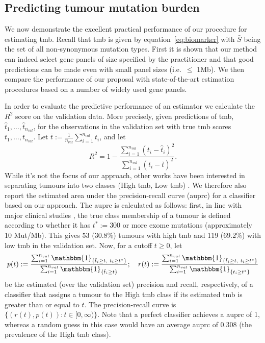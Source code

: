 \documentclass[10pt,twoside,openright]{report}
\begin{document}
\subsection{Predicting tumour mutation burden \label{sec:tmb}}
We now demonstrate the excellent practical performance of our procedure for estimating \acrshort{tmb}. Recall that \acrshort{tmb} is given by equation~\eqref{eq:biomarker} with $\bar{S}$ being the set of all non-synonymous mutation types. First it is shown that our method can indeed select gene panels of size specified by the practitioner and that good predictions can be made even with small panel sizes (i.e.~$\leq$ 1Mb). We then compare the performance of our proposal with state-of-the-art estimation procedures based on a number of widely used gene panels.

In order to evaluate the predictive performance of an estimator we calculate the $R^2$ score on the validation data. More precisely, given predictions of \acrshort{tmb}, $\hat{t}_1, \ldots, \hat{t}_{n_{val}}$, for the observations in the validation set with true \acrshort{tmb} scores $t_1, \ldots, t_{n_{val}}$. Let $\bar{t} := \frac{1}{n_{val}} \sum_{i=1}^{n_{val}} t_i$, and let 
    \[
    R^2 = 1- \frac{\sum_{i =1}^{n_{val}}(t_i - \hat{t}_i)^2}{\sum_{i = 1}^{n_{val}}(t_i - \bar{t})^2}. 
    \]
 While it's not the focus of our approach, other works have been interested in separating tumours into two classes (High \acrshort{tmb}, Low \acrshort{tmb}) \citep{buttner_implementing_2019, wu_designing_2019}. We therefore also report the estimated area under the precision-recall curve (\acrshort{auprc}) for a classifier based on our approach. The \acrshort{auprc} is calculated as follows: first, in line with major clinical studies \citep[see, for example,][]{hellmann_nivolumab_2018, ramalingam_abstract_2018}, the true class membership of a tumour is defined according to whether it has $t^* := 300$ or more exome mutations (approximately 10 Mut/Mb). This gives 53 (30.8\%) tumours with high \acrshort{tmb} and 119 (69.2\%) with low \acrshort{tmb} in the validation set. Now, for a cutoff $t \geq 0$, let 
 \[
 p(t) := \frac{\sum_{i=1}^{n_{val}} \mathbbm{1}_{\{\hat{t}_i \geq t, \ t_i \geq t^*\}}}{\sum_{i=1}^{n_{val}} \mathbbm{1}_{\{\hat{t}_i \geq t\}}}; \quad  r(t) := \frac{\sum_{i=1}^{n_{val}} \mathbbm{1}_{\{\hat{t}_i \geq t, \ t_i \geq t^*\}}}{\sum_{i=1}^{n_{val}} \mathbbm{1}_{\{t_i \geq t^*\}}}
 \]
 be the estimated (over the validation set) precision and recall, respectively, of a classifier that assigns a tumour to the High \acrshort{tmb} class if its estimated \acrshort{tmb} is greater than or equal to $t$.  The precision-recall curve is $\{(r(t),p(t)): t \in [0, \infty)\}$. Note that a perfect classifier achieves a \acrshort{auprc} of 1, whereas a random guess in this case would have an average \acrshort{auprc} of 0.308 (the prevalence of the High \acrshort{tmb} class).
\end{document}
